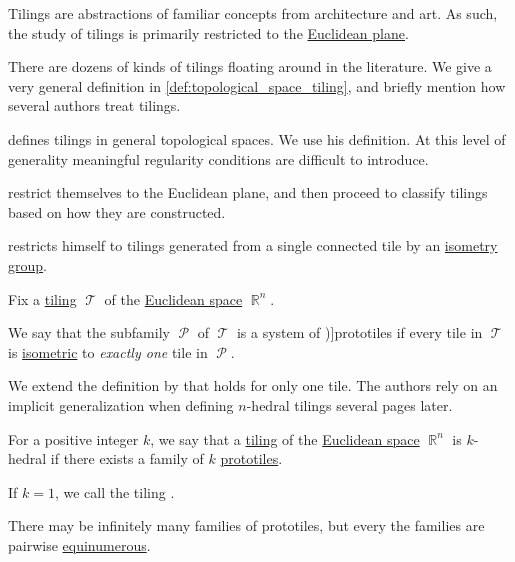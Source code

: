 \begin{remark}\label{rem:tiling_definition}
  Tilings are abstractions of familiar concepts from architecture and art. As such, the study of tilings is primarily restricted to the \hyperref[def:euclidean_plane]{Euclidean plane}.

  There are dozens of kinds of tilings floating around in the literature. We give a very general definition in \cref{def:topological_space_tiling}, and briefly mention how several authors treat tilings.

  \begin{thmenum}
     \textcite[611]{Arenas1999Tilings} defines tilings in general topological spaces. We use his definition. At this level of generality meaningful regularity conditions are difficult to introduce.

     \textcite[16]{GrünbaumShephard1987TilingsAndPatterns} restrict themselves to the Euclidean plane, and then proceed to classify tilings based on how they are constructed.

     \textcite[\S 1.7.3]{Berger1987GeometryI} restricts himself to tilings generated from a single connected tile by an \hyperref[def:isometry_group]{isometry group}.
  \end{thmenum}
\end{remark}

\begin{definition}\label{def:prototile}\mimprovised
  Fix a \hyperref[def:topological_space_tiling]{tiling} \( \mscrT \) of the \hyperref[def:euclidean_space]{Euclidean space} \( \BbbR^n \).

  We say that the subfamily \( \mscrP \) of \( \mscrT \) is a system of \term[en=prototile (\cite[20]{GrünbaumShephard1987TilingsAndPatterns})]{prototiles} if every tile in \( \mscrT \) is \hyperref[def:isometry]{isometric} to \emph{exactly one} tile in \( \mscrP \).
\end{definition}
\begin{comments}
  \item We extend the definition by \textcite[20]{GrünbaumShephard1987TilingsAndPatterns} that holds for only one tile. The authors rely on an implicit generalization when defining \( n \)-hedral tilings several pages later.
\end{comments}

\begin{definition}\label{def:k_hedral_tiling}
  For a positive integer \( k \), we say that a \hyperref[def:topological_space_tiling]{tiling} of the \hyperref[def:euclidean_space]{Euclidean space} \( \BbbR^n \) is \( k \)-hedral if there exists a family of \( k \) \hyperref[def:prototile]{prototiles}.

  If \( k = 1 \), we call the tiling .
\end{definition}
\begin{defproof}
  There may be infinitely many families of prototiles, but every the families are pairwise \hyperref[def:equinumerosity]{equinumerous}.
\end{defproof}

